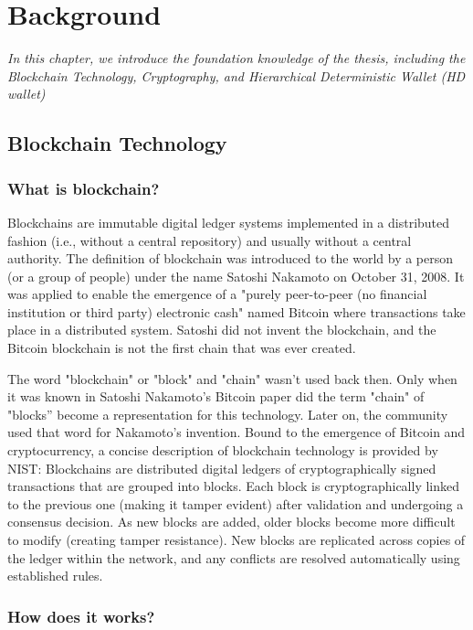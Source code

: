 \chapter{Background}
\label{chap:background}

\textit{In this chapter, we introduce the foundation knowledge of the thesis, including the Blockchain Technology, Cryptography, and Hierarchical Deterministic Wallet (HD wallet)}

\minitoc

\section{Blockchain Technology}
\label{blockchain}
\bigskip
\subsection{What is blockchain?}

Blockchains are immutable digital ledger systems implemented in a distributed fashion (i.e., without a central repository) and usually without a central authority. The definition of blockchain was introduced to the world by a person (or a group of people) under the name Satoshi Nakamoto on October 31, 2008. It was applied to enable the emergence of a "purely peer-to-peer (no financial institution or third party) electronic cash" named Bitcoin where transactions take place in a distributed system. Satoshi did not invent the blockchain, and the Bitcoin blockchain is not the first chain that was ever created.

The word "blockchain" or "block" and "chain" wasn't used back then. Only when it was known in Satoshi Nakamoto's Bitcoin paper did the term "chain" of "blocks” become a representation for this technology. Later on, the community used that word for Nakamoto's invention. Bound to the emergence of Bitcoin and cryptocurrency, a concise description of blockchain technology is provided by NIST: Blockchains are distributed digital ledgers of cryptographically signed transactions that are grouped into blocks. Each block is cryptographically linked to the previous one (making it tamper evident) after validation and undergoing a consensus decision. As new blocks are added, older blocks become more difficult to modify (creating tamper resistance). New blocks are replicated across copies of the ledger within the network, and any conflicts are resolved automatically using established rules.

\subsection{How does it works?}


